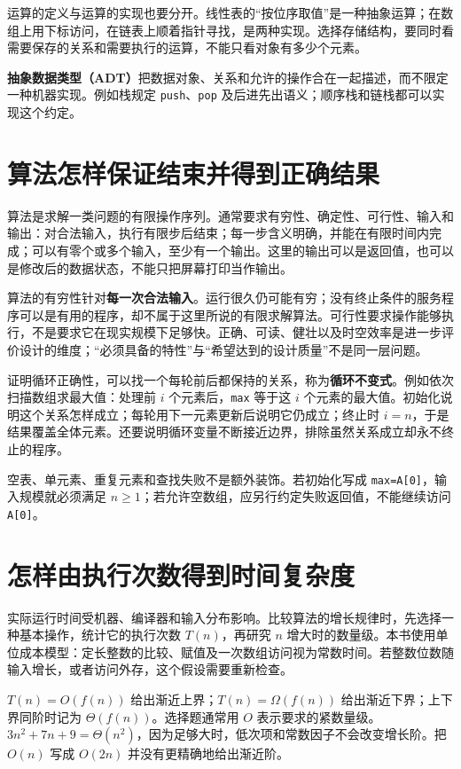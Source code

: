 运算的定义与运算的实现也要分开。线性表的``按位序取值''是一种抽象运算；在数组上用下标访问，在链表上顺着指针寻找，是两种实现。选择存储结构，要同时看需要保存的关系和需要执行的运算，不能只看对象有多少个元素。

\textbf{抽象数据类型（ADT）}把数据对象、关系和允许的操作合在一起描述，而不限定一种机器实现。例如栈规定 \allowbreak{}\texttt{push}、\allowbreak{}\texttt{pop} 及后进先出语义；顺序栈和链栈都可以实现这个约定。

\section{算法怎样保证结束并得到正确结果}\label{ds-01-02}

算法是求解一类问题的有限操作序列。通常要求有穷性、确定性、可行性、输入和输出：对合法输入，执行有限步后结束；每一步含义明确，并能在有限时间内完成；可以有零个或多个输入，至少有一个输出。这里的输出可以是返回值，也可以是修改后的数据状态，不能只把屏幕打印当作输出。

算法的有穷性针对\textbf{每一次合法输入}。运行很久仍可能有穷；没有终止条件的服务程序可以是有用的程序，却不属于这里所说的有限求解算法。可行性要求操作能够执行，不是要求它在现实规模下足够快。正确、可读、健壮以及时空效率是进一步评价设计的维度；``必须具备的特性''与``希望达到的设计质量''不是同一层问题。

证明循环正确性，可以找一个每轮前后都保持的关系，称为\textbf{循环不变式}。例如依次扫描数组求最大值：处理前 \(i\) 个元素后，\allowbreak{}\texttt{max} 等于这 \(i\) 个元素的最大值。初始化说明这个关系怎样成立；每轮用下一元素更新后说明它仍成立；终止时 \(i=n\)，于是结果覆盖全体元素。还要说明循环变量不断接近边界，排除虽然关系成立却永不终止的程序。

空表、单元素、重复元素和查找失败不是额外装饰。若初始化写成 \allowbreak{}\texttt{max=A{[}0{]}}，输入规模就必须满足 \(n\ge1\)；若允许空数组，应另行约定失败返回值，不能继续访问 \allowbreak{}\texttt{A{[}0{]}}。

\section{怎样由执行次数得到时间复杂度}\label{ds-01-03}

实际运行时间受机器、编译器和输入分布影响。比较算法的增长规律时，先选择一种基本操作，统计它的执行次数 \(T(n)\)，再研究 \(n\) 增大时的数量级。本书使用单位成本模型：定长整数的比较、赋值及一次数组访问视为常数时间。若整数位数随输入增长，或者访问外存，这个假设需要重新检查。

\(T(n)=O(f(n))\) 给出渐近上界；\(T(n)=\Omega(f(n))\) 给出渐近下界；上下界同阶时记为 \(\Theta(f(n))\)。选择题通常用 \(O\) 表示要求的紧数量级。\(3n^2+7n+9=\Theta(n^2)\)，因为足够大时，低次项和常数因子不会改变增长阶。把 \(O(n)\) 写成 \(O(2n)\) 并没有更精确地给出渐近阶。

